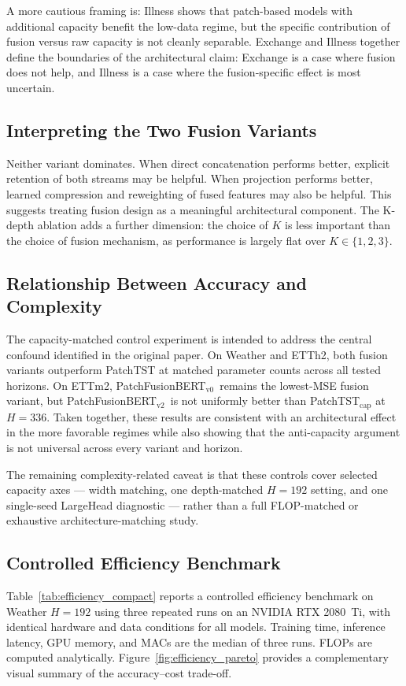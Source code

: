 \documentclass{ieeeaccess}
\newcommand{\modelvzero}{PatchFusionBERT$_{\text{v0}}$\xspace}
\newcommand{\modelvtwo}{PatchFusionBERT$_{\text{v2}}$\xspace}
\begin{document}
A more cautious framing is: Illness shows that patch-based models with
additional capacity benefit the low-data regime, but the specific contribution of
fusion versus raw capacity is not cleanly separable. Exchange and Illness together
define the boundaries of the architectural claim: Exchange is a case where fusion does not help,
and Illness is a case where the fusion-specific effect is most uncertain.

\subsection{Interpreting the Two Fusion Variants}
Neither variant dominates. When direct concatenation performs better, explicit
retention of both streams may be helpful. When projection performs better, learned
compression and reweighting of fused features may also be helpful. This suggests treating
fusion design as a meaningful architectural component. The K-depth ablation adds a
further dimension: the choice of $K$ is less important than the choice of fusion
mechanism, as performance is largely flat over $K \in \{1,2,3\}$.

\subsection{Relationship Between Accuracy and Complexity}
The capacity-matched control experiment is intended to address the central confound
identified in the original paper. On Weather and ETTh2, both fusion variants
outperform PatchTST at matched parameter counts across all tested horizons. On ETTm2,
\modelvzero\ remains the lowest-MSE fusion variant, but \modelvtwo\ is not uniformly better than
PatchTST$_\text{cap}$ at $H=336$. Taken together, these results are consistent with an
architectural effect in the more favorable regimes while also showing that the
anti-capacity argument is not universal across every variant and horizon.

The remaining complexity-related caveat is that these controls cover selected
capacity axes --- width matching, one depth-matched $H=192$ setting, and one
single-seed LargeHead diagnostic --- rather than a full FLOP-matched or
exhaustive architecture-matching study.

\subsection{Controlled Efficiency Benchmark}
Table~\ref{tab:efficiency_compact} reports a controlled efficiency benchmark on
Weather $H=192$ using three repeated runs on an NVIDIA RTX 2080~Ti, with identical
hardware and data conditions for all models. Training time, inference latency, GPU
memory, and MACs are the median of three runs. FLOPs are computed analytically.
Figure~\ref{fig:efficiency_pareto}
provides a complementary visual summary of the accuracy--cost trade-off.
\end{document}
